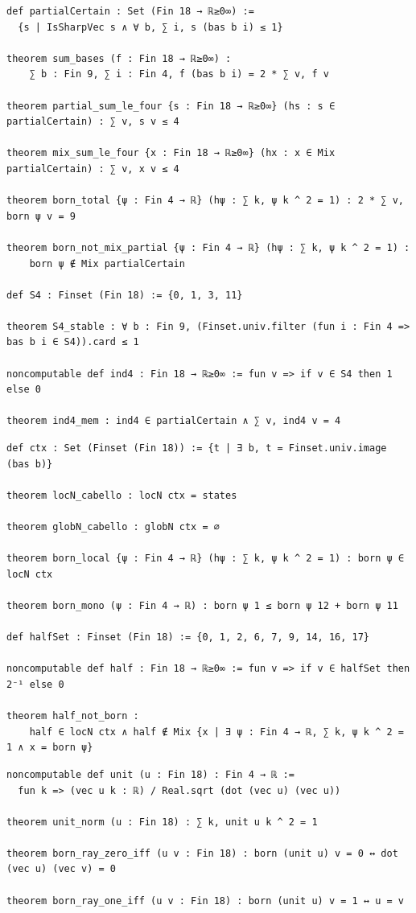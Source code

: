 \label{lean:quantum-partial}
\begin{lstlisting}
def partialCertain : Set (Fin 18 → ℝ≥0∞) :=
  {s | IsSharpVec s ∧ ∀ b, ∑ i, s (bas b i) ≤ 1}

theorem sum_bases (f : Fin 18 → ℝ≥0∞) :
    ∑ b : Fin 9, ∑ i : Fin 4, f (bas b i) = 2 * ∑ v, f v

theorem partial_sum_le_four {s : Fin 18 → ℝ≥0∞} (hs : s ∈ partialCertain) : ∑ v, s v ≤ 4

theorem mix_sum_le_four {x : Fin 18 → ℝ≥0∞} (hx : x ∈ Mix partialCertain) : ∑ v, x v ≤ 4

theorem born_total {ψ : Fin 4 → ℝ} (hψ : ∑ k, ψ k ^ 2 = 1) : 2 * ∑ v, born ψ v = 9

theorem born_not_mix_partial {ψ : Fin 4 → ℝ} (hψ : ∑ k, ψ k ^ 2 = 1) :
    born ψ ∉ Mix partialCertain

def S4 : Finset (Fin 18) := {0, 1, 3, 11}

theorem S4_stable : ∀ b : Fin 9, (Finset.univ.filter (fun i : Fin 4 => bas b i ∈ S4)).card ≤ 1

noncomputable def ind4 : Fin 18 → ℝ≥0∞ := fun v => if v ∈ S4 then 1 else 0

theorem ind4_mem : ind4 ∈ partialCertain ∧ ∑ v, ind4 v = 4
\end{lstlisting}

\label{lean:loc-quantum}
\begin{lstlisting}
def ctx : Set (Finset (Fin 18)) := {t | ∃ b, t = Finset.univ.image (bas b)}

theorem locN_cabello : locN ctx = states

theorem globN_cabello : globN ctx = ∅

theorem born_local {ψ : Fin 4 → ℝ} (hψ : ∑ k, ψ k ^ 2 = 1) : born ψ ∈ locN ctx

theorem born_mono (ψ : Fin 4 → ℝ) : born ψ 1 ≤ born ψ 12 + born ψ 11

def halfSet : Finset (Fin 18) := {0, 1, 2, 6, 7, 9, 14, 16, 17}

noncomputable def half : Fin 18 → ℝ≥0∞ := fun v => if v ∈ halfSet then 2⁻¹ else 0

theorem half_not_born :
    half ∈ locN ctx ∧ half ∉ Mix {x | ∃ ψ : Fin 4 → ℝ, ∑ k, ψ k ^ 2 = 1 ∧ x = born ψ}
\end{lstlisting}

\label{lean:born-ray}
\begin{lstlisting}
noncomputable def unit (u : Fin 18) : Fin 4 → ℝ :=
  fun k => (vec u k : ℝ) / Real.sqrt (dot (vec u) (vec u))

theorem unit_norm (u : Fin 18) : ∑ k, unit u k ^ 2 = 1

theorem born_ray_zero_iff (u v : Fin 18) : born (unit u) v = 0 ↔ dot (vec u) (vec v) = 0

theorem born_ray_one_iff (u v : Fin 18) : born (unit u) v = 1 ↔ u = v
\end{lstlisting}
